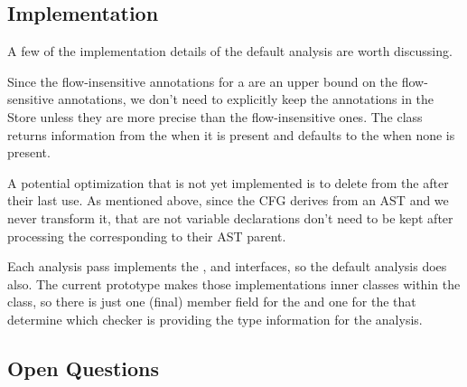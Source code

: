 \subsection{Implementation}

A few of the implementation details of the default analysis are worth discussing.

Since the flow-insensitive annotations for a  are an upper bound on the flow-sensitive 
annotations, we don't need to explicitly keep the annotations in the Store unless they are more
precise than the flow-insensitive ones.  The  class returns
information from the  when it is present and defaults to the 
 when none is present.

A potential optimization that is not yet implemented is to delete  from the 
 after
their last use.  As mentioned above, since the CFG derives from an AST and we never 
transform it,  that are not variable declarations don't need to be kept after processing 
the  
corresponding to their AST parent.

Each analysis pass implements the ,  and 
 interfaces, so the
default analysis does also.  The current prototype makes those implementations inner
classes within the  class, so there is just one (final) member field
for the  and one for the  that determine 
which checker is providing the type information for the analysis.


\subsection{Open Questions}

